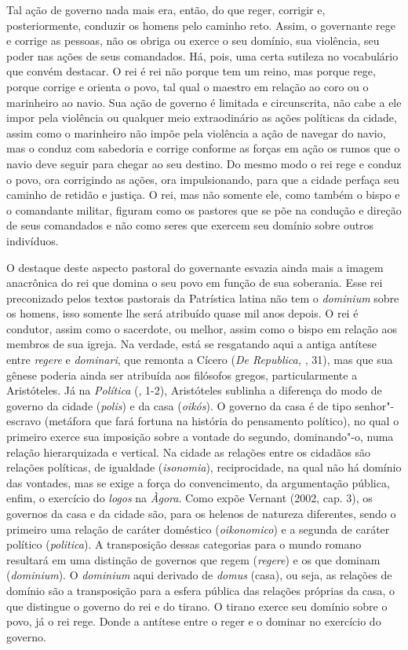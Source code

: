 Tal ação de governo nada mais era, então, do que reger, corrigir e,
posteriormente, conduzir os homens pelo caminho reto. Assim, o
governante rege e corrige as pessoas, não os obriga ou exerce o seu
domínio, sua violência, seu poder nas ações de seus comandados. Há,
pois, uma certa sutileza no vocabulário que convém destacar. O rei é rei
não porque tem um reino, mas porque rege, porque corrige e orienta o
povo, tal qual o maestro em relação ao coro ou o marinheiro ao navio.
Sua ação de governo é limitada e circunscrita, não cabe a ele impor pela
violência ou qualquer meio extraodinário as ações políticas da cidade,
assim como o marinheiro não impõe pela violência a ação de navegar do
navio, mas o conduz com sabedoria e corrige conforme as forças em ação
os rumos que o navio deve seguir para chegar ao seu destino. Do mesmo
modo o rei rege e conduz o povo, ora corrigindo as ações, ora
impulsionando, para que a cidade perfaça seu caminho de retidão e
justiça. O rei, mas não somente ele, como também o bispo e o comandante
militar, figuram como os pastores que se põe na condução e direção de
seus comandados e não como seres que exercem seu domínio sobre outros
indivíduos.

O destaque deste aspecto pastoral do governante esvazia ainda mais a
imagem anacrônica do rei que domina o seu povo em função de sua
soberania. Esse rei preconizado pelos textos pastorais da Patrística
latina não tem o \emph{dominium} sobre os homens, isso somente lhe será
atribuído quase mil anos depois. O rei é condutor, assim como o
sacerdote, ou melhor, assim como o bispo em relação aos membros de sua
igreja. Na verdade, está se resgatando aqui a antiga antítese entre
\emph{regere} e \emph{dominari}, que remonta a Cícero (\emph{De
Republica,} , 31), mas que sua gênese poderia ainda ser atribuída aos
filósofos gregos, particularmente a Aristóteles. Já na \emph{Política}
(, 1-2), Aristóteles sublinha a diferença do modo de governo da
cidade (\emph{polis}) e da casa (\emph{oikós}). O governo da casa é de
tipo senhor"-escravo (metáfora que fará fortuna na história do pensamento
político), no qual o primeiro exerce sua imposição sobre a vontade do
segundo, dominando"-o, numa relação hierarquizada e vertical. Na cidade
as relações entre os cidadãos são relações políticas, de igualdade
(\emph{isonomia}), reciprocidade, na qual não há domínio das vontades,
mas se exige a força do convencimento, da argumentação pública, enfim, o
exercício do \emph{logos} na \emph{Àgora}. Como expõe Vernant (2002,
cap. 3), os governos da casa e da cidade são, para os helenos de
natureza diferentes, sendo o primeiro uma relação de caráter doméstico
(\emph{oikonomico}) e a segunda de caráter político (\emph{politica}). A
transposição dessas categorias para o mundo romano resultará em uma
distinção de governos que regem (\emph{regere}) e os que dominam
(\emph{dominium}). O \emph{dominium} aqui derivado de \emph{domus}
(casa), ou seja, as relações de domínio são a transposição para a esfera
pública das relações próprias da casa, o que distingue o governo do rei
e do tirano. O tirano exerce seu domínio sobre o povo, já o rei rege.
Donde a antítese entre o reger e o dominar no exercício do governo.

